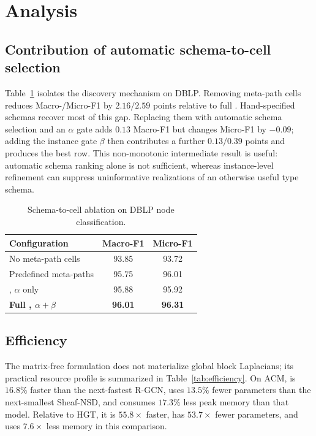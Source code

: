 \section{Analysis}
\label{sec:analysis-results}

\subsection{Contribution of automatic schema-to-cell selection}

Table~\ref{tab:ablation-schema} isolates the discovery mechanism on DBLP. Removing meta-path cells
reduces Macro-/Micro-F1 by $2.16/2.59$ points relative to full \ampss{}. Hand-specified schemas
recover most of this gap. Replacing them with automatic schema selection and an $\alpha$ gate adds
$0.13$ Macro-F1 but changes Micro-F1 by $-0.09$; adding the instance gate $\beta$ then contributes a
further $0.13/0.39$ points and produces the best row. This non-monotonic intermediate result is
useful: automatic schema ranking alone is not sufficient, whereas instance-level refinement can
suppress uninformative realizations of an otherwise useful type schema.

\begin{table}[H]
  \centering
  \caption{Schema-to-cell ablation on DBLP node classification.}
  \label{tab:ablation-schema}
  \small
  \begin{tabular}{lcc}
    \toprule
    \textbf{Configuration} & Macro-F1 & Micro-F1 \\
    \midrule
    No meta-path cells & 93.85 & 93.72 \\
    Predefined meta-paths & 95.75 & 96.01 \\
    \ampss{}, $\alpha$ only & 95.88 & 95.92 \\
    \textbf{Full \ampss{}, $\alpha+\beta$} & \textbf{96.01} & \textbf{96.31} \\
    \bottomrule
  \end{tabular}
\end{table}

\subsection{Efficiency}

The matrix-free formulation does not materialize global block Laplacians; its practical resource
profile is summarized in Table~\ref{tab:efficiency}. On ACM, \method{} is $16.8\%$ faster than the
next-fastest R-GCN, uses $13.5\%$ fewer parameters than the next-smallest Sheaf-NSD, and consumes
$17.3\%$ less peak memory than that model. Relative to HGT, it is $55.8\times$ faster, has
$53.7\times$ fewer parameters, and uses $7.6\times$ less memory in this comparison.

